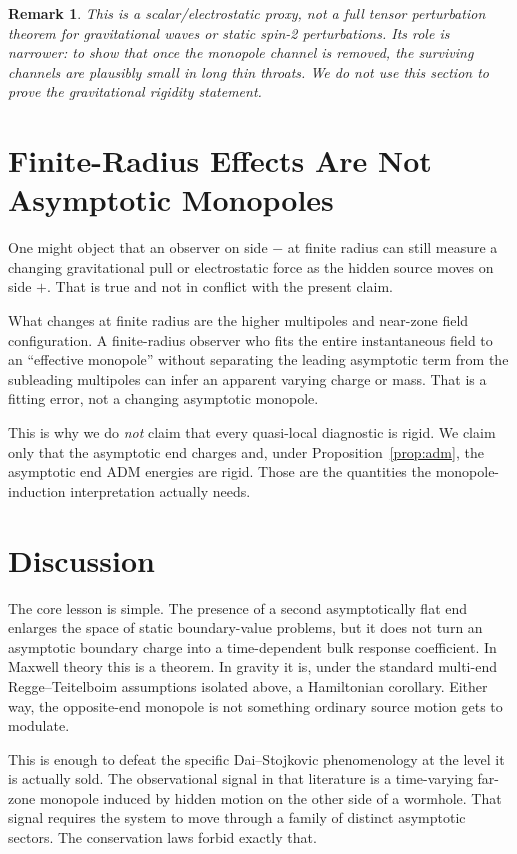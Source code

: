 \documentclass[aps,prd,onecolumn,nofootinbib,superscriptaddress]{revtex4-2}
\newtheorem{remark}{Remark}
\begin{document}
\begin{remark}
This is a scalar/electrostatic proxy, not a full tensor perturbation theorem for gravitational waves or static spin-2 perturbations. Its role is narrower: to show that once the monopole channel is removed, the surviving channels are plausibly small in long thin throats. We do not use this section to prove the gravitational rigidity statement.
\end{remark}

\section{Finite-Radius Effects Are Not Asymptotic Monopoles}
\label{sec:quasilocal}

One might object that an observer on side $-$ at finite radius can still measure a changing gravitational pull or electrostatic force as the hidden source moves on side $+$. That is true and not in conflict with the present claim.

What changes at finite radius are the higher multipoles and near-zone field configuration. A finite-radius observer who fits the entire instantaneous field to an ``effective monopole'' without separating the leading asymptotic term from the subleading multipoles can infer an apparent varying charge or mass. That is a fitting error, not a changing asymptotic monopole.

This is why we do \emph{not} claim that every quasi-local diagnostic is rigid. We claim only that the asymptotic end charges and, under Proposition~\ref{prop:adm}, the asymptotic end ADM energies are rigid. Those are the quantities the monopole-induction interpretation actually needs.

\section{Discussion}
\label{sec:discussion}

The core lesson is simple. The presence of a second asymptotically flat end enlarges the space of static boundary-value problems, but it does not turn an asymptotic boundary charge into a time-dependent bulk response coefficient. In Maxwell theory this is a theorem. In gravity it is, under the standard multi-end Regge--Teitelboim assumptions isolated above, a Hamiltonian corollary. Either way, the opposite-end monopole is not something ordinary source motion gets to modulate.

This is enough to defeat the specific Dai--Stojkovic phenomenology at the level it is actually sold. The observational signal in that literature is a time-varying far-zone monopole induced by hidden motion on the other side of a wormhole. That signal requires the system to move through a family of distinct asymptotic sectors. The conservation laws forbid exactly that.
\end{document}
